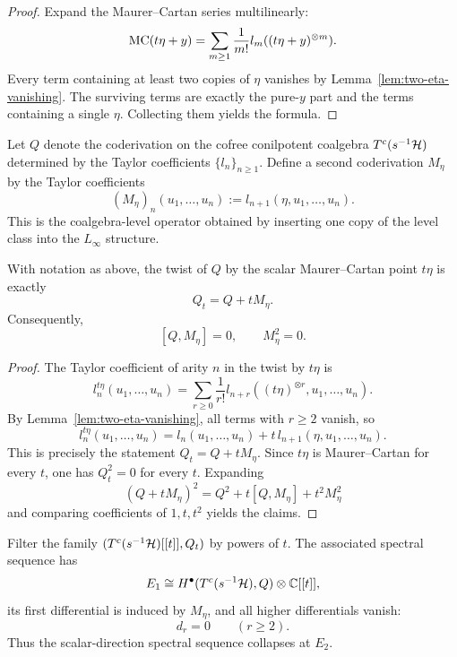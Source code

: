 \begin{proof}
Expand the Maurer--Cartan series multilinearly:
\[
\mathrm{MC}(t\eta+y)=\sum_{m\ge 1}\frac{1}{m!}l_m((t\eta+y)^{\otimes m}).
\]
Every term containing at least two copies of $\eta$ vanishes by
Lemma~\ref{lem:two-eta-vanishing}.  The surviving terms are exactly the pure-$y$
part and the terms containing a single $\eta$.  Collecting them yields the
formula.\end{proof}


\begin{construction}
\label{cons:scalar-insertion-coderivation}
Let $Q$ denote the coderivation on the cofree conilpotent coalgebra
$T^c(s^{-1}\mathcal{H})$ determined by the Taylor coefficients $\{l_n\}_{n\ge 1}$.  Define
a second coderivation $M_\eta$ by the Taylor coefficients
\[
(M_\eta)_n(u_1,\dots,u_n):=l_{n+1}(\eta,u_1,\dots,u_n).
\]
This is the coalgebra-level operator obtained by inserting one copy of the
level class into the $L_\infty$ structure.
\end{construction}

\begin{proposition}
\label{prop:square-zero-insertion}
With notation as above, the twist of $Q$ by the scalar Maurer--Cartan point
$t\eta$ is exactly
\[
Q_t=Q+tM_\eta.
\]
Consequently,
\[
[Q,M_\eta]=0,
\qquad
M_\eta^2=0.
\]
\end{proposition}

\begin{proof}
The Taylor coefficient of arity $n$ in the twist by $t\eta$ is
\[
l_n^{t\eta}(u_1,\dots,u_n)=\sum_{r\ge 0}\frac{1}{r!}l_{n+r}((t\eta)^{\otimes r},u_1,\dots,u_n).
\]
By Lemma~\ref{lem:two-eta-vanishing}, all terms with $r\ge 2$ vanish, so
\[
l_n^{t\eta}(u_1,\dots,u_n)=l_n(u_1,\dots,u_n)+t\,l_{n+1}(\eta,u_1,\dots,u_n).
\]
This is precisely the statement $Q_t=Q+tM_\eta$.  Since $t\eta$ is Maurer--Cartan
for every $t$, one has $Q_t^2=0$ for every $t$.  Expanding
\[
(Q+tM_\eta)^2=Q^2+t[Q,M_\eta]+t^2M_\eta^2
\]
and comparing coefficients of $1,t,t^2$ yields the claims.\end{proof}

\begin{corollary}
\label{cor:two-step-scalar-sseq}
Filter the family $(T^c(s^{-1}\mathcal{H})[[t]],Q_t)$ by powers of $t$.  The associated
spectral sequence has
\[
E_1\cong H^\bullet(T^c(s^{-1}\mathcal{H}),Q)\otimes \mathbb{C}[[t]],
\]
its first differential is induced by $M_\eta$, and all higher differentials
vanish:
\[
d_r=0\qquad(r\ge 2).
\]
Thus the scalar-direction spectral sequence collapses at $E_2$.
\end{corollary}

